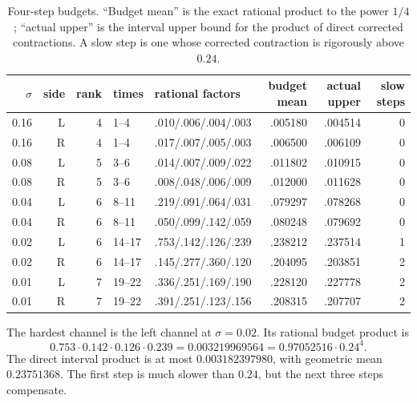 \documentclass[11pt]{article}
\theoremstyle{definition}
\theoremstyle{remark}
\begin{document}
\begin{table}[ht]
\centering
\scriptsize
\begin{tabular}{rrrllrrr}
\toprule
$\sigma$ & side & rank & times & rational factors & budget mean & actual upper & slow steps\\
\midrule
0.16 & L & 4 & 1--4 & .010/.006/.004/.003 & .005180 & .004514 & 0\\
0.16 & R & 4 & 1--4 & .017/.007/.005/.003 & .006500 & .006109 & 0\\
0.08 & L & 5 & 3--6 & .014/.007/.009/.022 & .011802 & .010915 & 0\\
0.08 & R & 5 & 3--6 & .008/.048/.006/.009 & .012000 & .011628 & 0\\
0.04 & L & 6 & 8--11 & .219/.091/.064/.031 & .079297 & .078268 & 0\\
0.04 & R & 6 & 8--11 & .050/.099/.142/.059 & .080248 & .079692 & 0\\
0.02 & L & 6 & 14--17 & .753/.142/.126/.239 & .238212 & .237514 & 1\\
0.02 & R & 6 & 14--17 & .145/.277/.360/.120 & .204095 & .203851 & 2\\
0.01 & L & 7 & 19--22 & .336/.251/.169/.190 & .228120 & .227778 & 2\\
0.01 & R & 7 & 19--22 & .391/.251/.123/.156 & .208315 & .207707 & 2\\
\bottomrule
\end{tabular}
\caption{Four-step budgets.  ``Budget mean'' is the exact rational product to
the power $1/4$; ``actual upper'' is the interval upper bound for the product
of direct corrected contractions.  A slow step is one whose corrected
contraction is rigorously above $0.24$.}
\label{tab:blocks}
\end{table}

The hardest channel is the left channel at $\sigma=0.02$.  Its rational
budget product is
\[
 0.753\cdot0.142\cdot0.126\cdot0.239
 =0.003219969564
 =0.97052516\cdot0.24^4.
\]
The direct interval product is at most $0.003182397980$, with geometric mean
$0.23751368$.  The first step is much slower than $0.24$, but the next three
steps compensate.
\end{document}
